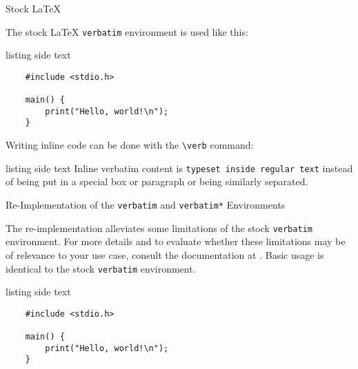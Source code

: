 \documentclass[article,a4paper,oneside,10pt]{memoir}
\makeatletter
\renewcommand{\section}{%
  \sechook%
  \@startsection{section}{1}%
      {\secindent}%
      {\beforesecskip}%
      {\aftersecskip}%
      {\sffamily\secheadstyle}} %
\newcommand\code[1]{\texttt{#1}}
\makeatother
\begin{document}
\section{Stock \LaTeX}
\label{sec:verbatim:stock}

The stock \LaTeX{} \code{verbatim} environment is used like this:

\begin{tcblisting}{listing side text}
    \begin{verbatim}
    #include <stdio.h>

    main() {
        print("Hello, world!\n");
    }
    \end{verbatim}
\end{tcblisting}

Writing inline code can be done with the \code{\textbackslash{}verb} command:

\begin{tcblisting}{listing side text}
    Inline  verbatim content  is  
    \verb|typeset inside regular text| 
    instead of being put in a special box or
    paragraph or being similarly separated.
\end{tcblisting}

\section{Re-Implementation of the \code{verbatim} and \code{verbatim*} Environments \cite{verbatim}}
\label{sec:verbatim:reimp}

The re-implementation alleviates some limitations of the stock \code{verbatim}
environment. For  more  details  and  to evaluate  whether  these  limitations
may  be  of  relevance  to  your   use  case,  consult  the  documentation  at
\cite{verbatim}. Basic  usage  is  identical   to  the  stock  \code{verbatim}
environment.

\begin{tcblisting}{listing side text}
    \begin{verbatim}
    #include <stdio.h>

    main() {
        print("Hello, world!\n");
    }
    \end{verbatim}
\end{tcblisting}
\end{document}
